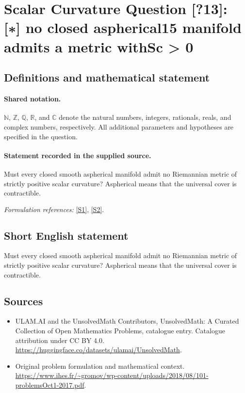 \documentclass[11pt]{article}
\newcommand{\sref}[2]{\hyperlink{source:#1:#2}{[S#2]}}
\begin{document}
\section{Scalar Curvature Question [?13]: [∗] no closed aspherical15 manifold admits a metric withSc > 0}\label{statement}

\subsection{Definitions and mathematical statement}

\paragraph{Shared notation.}$\mathbb N$, $\mathbb Z$, $\mathbb Q$, $\mathbb R$, and $\mathbb C$ denote the natural numbers, integers, rationals, reals, and complex numbers, respectively. All additional parameters and hypotheses are specified in the question.


\paragraph{Statement recorded in the supplied source.}
Must every closed smooth aspherical manifold admit no Riemannian metric of strictly positive scalar curvature? Aspherical means that the universal cover is contractible.
\par\smallskip\textit{Formulation references:} \sref{statement}{1}, \sref{statement}{2}.
\subsection{Short English statement}
Must every closed smooth aspherical manifold admit no Riemannian metric of strictly positive scalar curvature? Aspherical means that the universal cover is contractible.
\subsection{Sources}
\begin{itemize}
\item[\hypertarget{source:statement:1}{S1}] ULAM.AI and the UnsolvedMath Contributors, UnsolvedMath: A Curated Collection of Open Mathematics Problems, catalogue entry. Catalogue attribution under CC BY 4.0.
\url{https://huggingface.co/datasets/ulamai/UnsolvedMath}.
\item[\hypertarget{source:statement:2}{S2}] Original problem formulation and mathematical context.
\url{https://www.ihes.fr/~gromov/wp-content/uploads/2018/08/101-problemsOct1-2017.pdf}.
\end{itemize}
\label{end:statement}
\end{document}
